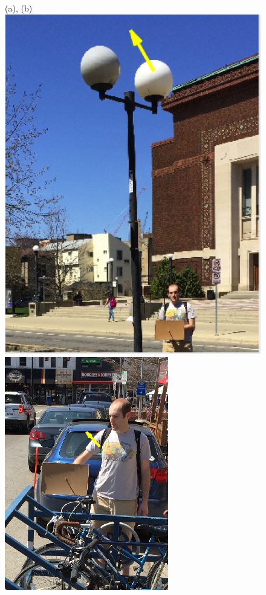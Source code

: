 \documentclass[10pt,twocolumn,letterpaper]{article}
\begin{document}
\begin{figure}[h]
(a), (b)\\
\includegraphics[scale = 0.3]{lamppost.png}
\includegraphics[scale = 0.374]{bike_rack_1.png}

\end{figure}
\end{document}
